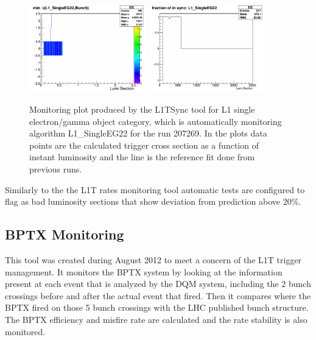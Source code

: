 \begin{figure}[!htb]
\centering
\includegraphics[width=0.45\textwidth]{Chapter03/L1TOnline/Images/L1TDQM_Online_Run207269_L1TSync_AlgoVsBunchStructure_EG.png}
\includegraphics[width=0.45\textwidth]{Chapter03/L1TOnline/Images/L1TDQM_Online_Run207269_L1TSync_Certification_EG.png}
\caption{Monitoring plot produced by the L1TSync tool for L1 single electron/gamma object category, which is
automatically monitoring algorithm L1\_SingleEG22 for the run 207269. In the plots data points are the calculated
trigger cross section as a function of instant luminosity and the line is the reference fit done from previous runs.}
\label{FIGURE:TechnicalWork_SyncMonitoring}
\end{figure}

Similarly to the the \gls{L1T} rates monitoring tool automatic tests are configured to flag as bad luminosity sections that show deviation from prediction above 20\%. 

\subsection{BPTX Monitoring}


This tool was created during August 2012 to meet a concern of the \gls{L1T} trigger management. It monitors the \gls{BPTX} system by looking at the information present at each event that 
is analyzed by the \gls{DQM} system, including the 2 bunch crossings before and after the actual event that fired. Then it 
compares where the \gls{BPTX} fired on those 5 bunch crossings with the LHC published bunch structure. The \gls{BPTX} efficiency 
and misfire rate are calculated and the rate stability is also monitored.


